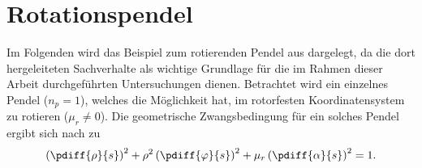 \chapter{Rotationspendel} \label{ap:Rotationspendel}



Im Folgenden wird das Beispiel zum rotierenden Pendel aus \cite{Mayet:Tautochronic} dargelegt, 
da die dort hergeleiteten Sachverhalte 
als wichtige Grundlage für die im Rahmen dieser Arbeit durchgeführten Untersuchungen dienen.
Betrachtet wird ein einzelnes Pendel ($n_p = 1$), welches die Möglichkeit hat, im rotorfesten
Koordinatensystem zu rotieren ($\mu_r \neq 0$). 
%
Die geometrische Zwangsbedingung für ein solches Pendel ergibt sich nach  zu
\begin{equation}
		\left(\pdiff{\rho}{s}\right)^2 +  \rho^2 \left(\pdiff{\varphi}{s}\right)^2    + \mu_{r} \left(\pdiff{\alpha}{s}\right)^2  = 1.
				\label{eq:AnhTautochronerAbsorberentwurfGeomZwangsbedRotPendel}
\end{equation}




